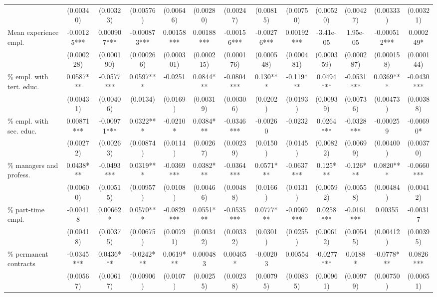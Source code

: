 \begin{threeparttable}
\begin{tabular}{l*{12}{S}}
                          &  (0.00340)   & (0.00323)   & (0.00576)    & (0.00646)  & (0.00280)  & (0.00247)   & (0.00815)   & (0.00750)  & (0.00520)  & (0.00427)  & (0.00333)    & (0.00321)  \\[1ex]
Mean experience empl.     &  -0.00125*** & 0.000907*** & -0.000873*** & 0.00158*** & 0.00188*** & -0.00156*** & -0.00276*** & 0.00192*** & -3.41e-05  & 1.95e-05   & -0.000512*** & 0.000249*  \\
                          &  (0.000228)  & (0.000190)  & (0.000266)   & (0.000301) & (0.000215) & (0.000176)  & (0.000548)  & (0.000481) & (0.000359) & (0.000287) & (0.000158)   & (0.000144) \\[1ex]
\% empl. with tert. educ. &  0.0587***   & -0.0577***  & 0.0597***    & -0.0251    & 0.0844***  & -0.0804***  & 0.130***    & -0.119***  & 0.0494***  & -0.0531*** & 0.0369***    & -0.0430*** \\
                          &  (0.00431)   & (0.00406)   & (0.0134)     & (0.0169)   & (0.00319)  & (0.00306)   & (0.0202)    & (0.0193)   & (0.00939)  & (0.00736)  & (0.00473)    & (0.00388)  \\[1ex]
\% empl. with sec. educ.  &  0.00871***  & -0.00971*** & 0.0322***    & -0.0210*   & 0.0384***  & -0.0346***  & -0.00260    & -0.0232    & 0.0264***  & -0.0328*** & -0.000259    & -0.00690*  \\
                          &  (0.00272)   & (0.00263)   & (0.00874)    & (0.0114)   & (0.00267)  & (0.00239)   & (0.0150)    & (0.0145)   & (0.00822)  & (0.00699)  & (0.00400)    & (0.00370)  \\[1ex]
\% managers and profess.  &  0.0438***   & -0.0493***  & 0.0319***    & -0.0369*** & 0.0382***  & -0.0364***  & 0.0571***   & -0.0637*** & 0.125***   & -0.126***  & 0.0820***    & -0.0660*** \\
                          &  (0.00600)   & (0.00515)   & (0.00957)    & (0.0108)   & (0.00466)  & (0.00488)   & (0.0166)    & (0.0131)   & (0.00592)  & (0.00558)  & (0.00484)    & (0.00412)  \\[1ex]
\% part-time empl.        &  -0.00418    & 0.00662*    & 0.0570***    & -0.0829*** & 0.0551***  & -0.0535***  & 0.0777***   & -0.0969*** & 0.0258***  & -0.0161*** & 0.00355      & -0.00317   \\
                          &  (0.00418)   & (0.00375)   & (0.00675)    & (0.00791)  & (0.00342)  & (0.00332)   & (0.0301)    & (0.0255)   & (0.00612)  & (0.00545)  & (0.00412)    & (0.00395)  \\[1ex]
\% permanent contracts    &  -0.0345***  & 0.0436***   & -0.0242***   & 0.0619***  & 0.000483   & 0.00465*    & -0.00203    & 0.00554    & -0.0277*** & 0.0188*    & -0.0778***   & 0.0826***  \\
                          &  (0.00567)   & (0.00617)   & (0.00906)    & (0.0107)   & (0.00255)  & (0.00238)   & (0.00795)   & (0.00835)  & (0.00961)  & (0.00979)  & (0.00750)    & (0.00651)  \\[1ex]


\end{tabular}
\end{threeparttable}
